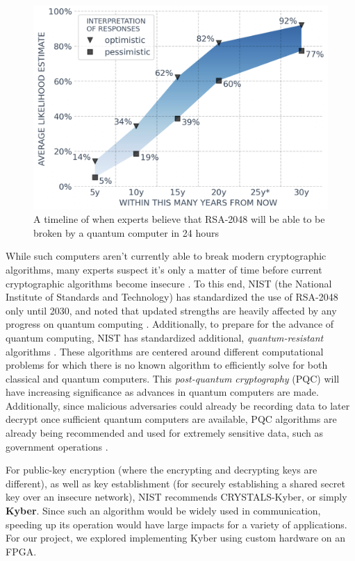 \begin{figure}
  \centering
  \includegraphics[width=\linewidth]{imgs/intro-timeline.png}
  \caption{
    A timeline of when experts believe that RSA-2048 will be
    able to be broken by a quantum computer in 24 hours
    \cite{threat-report}}
  \label{fig:intro-timeline}
\end{figure}

While such computers aren't currently able to break modern
cryptographic algorithms, many experts suspect it's only a
matter of time before current cryptographic algorithms
become insecure \cite{threat-report}. To this end, NIST
(the National Institute of Standards and Technology)
has standardized the use of RSA-2048 only until 2030, and
noted that updated strengths are heavily affected by any
progress on quantum computing \cite{nist-standards}.
Additionally, to prepare for the advance of quantum
computing, NIST has standardized additional,
\textit{quantum-resistant} algorithms \cite{nist-kyber}.
These algorithms are centered around different
computational problems for which there is no known
algorithm to efficiently solve for both classical and
quantum computers. This \textit{post-quantum cryptography}
(PQC) will have increasing significance as advances in
quantum computers are made. Additionally, since malicious
adversaries could already be recording data to later
decrypt once sufficient quantum computers are available,
PQC algorithms are already being recommended and used for
extremely sensitive data, such as government operations
\cite{quantum-law}.

For public-key encryption (where the encrypting and
decrypting keys are different), as well as key
establishment (for securely establishing a shared secret
key over an insecure network), NIST recommends
CRYSTALS-Kyber, or simply \textbf{Kyber}. Since such an
algorithm would be widely used in communication, speeding
up its operation would have large impacts for a variety of
applications. For our project, we explored implementing
Kyber using custom hardware on an FPGA.